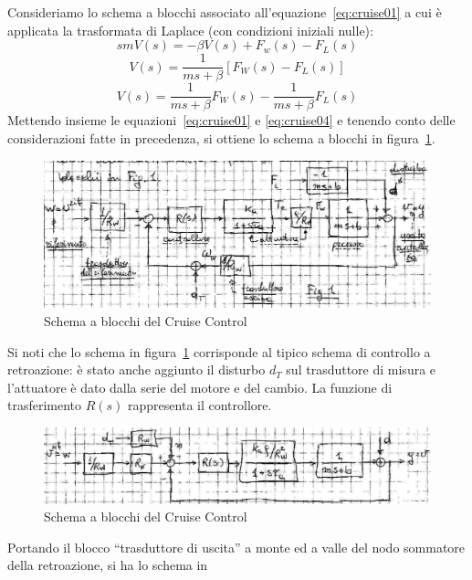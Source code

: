\documentclass[a4paper]{report}
\begin{document}
Consideriamo lo schema a blocchi associato
all'equazione~\ref{eq:cruise01} a cui \`e applicata la trasformata di
Laplace (con condizioni iniziali nulle):
\[
s m V(s) = - \beta V(s) + F_w(s) - F_L(s)
\]
\[
V(s) = \dfrac{1}{ms + \beta} [ F_W(s) - F_L(s)]
\]
\begin{equation}\label{eq:cruise04}
  V(s) = \dfrac{1}{ms + \beta} F_W(s) - \dfrac{1}{ms + \beta} F_L(s)
\end{equation}
Mettendo insieme le equazioni~\ref{eq:cruise01} e \ref{eq:cruise04} e
tenendo conto delle considerazioni fatte in precedenza, si ottiene lo
schema a blocchi in figura~\ref{fig:cruisecontrol01}.
\begin{figure}[!h]
  \begin{center}
    \includegraphics[scale=0.25]{./images/cruisecontrol01}
    \caption{Schema a blocchi del Cruise
      Control}\label{fig:cruisecontrol01}
  \end{center}
\end{figure}
Si noti che lo schema in figura~\ref{fig:cruisecontrol01} corrisponde
al tipico schema di controllo a retroazione: \`e stato anche aggiunto
il disturbo $d_T$ sul trasduttore di misura e l'attuatore \`e dato
dalla serie del motore e del cambio. La funzione di trasferimento
$R(s)$ rappresenta il controllore.
\begin{figure}[!h]
  \begin{center}
    \includegraphics[scale=0.25]{./images/cruisecontrol02}
    \caption{Schema a blocchi del Cruise
      Control}\label{fig:cruisecontrol02}
  \end{center}
\end{figure}
Portando il blocco ``trasduttore di uscita'' a monte ed a valle del
nodo sommatore della retroazione, si ha lo schema in
\end{document}
